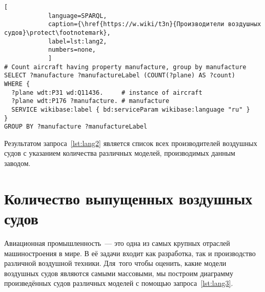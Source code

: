 \begin{lstlisting}[ 
            language=SPARQL, 
            caption={\href{https://w.wiki/t3n}{Производители воздушных судов}\protect\footnotemark}, 
            label=lst:lang2, 
            numbers=none,
            ]
# Count aircraft having property manufacture, group by manufacture
SELECT ?manufacture ?manufactureLabel (COUNT(?plane) AS ?count) 
WHERE {
  ?plane wdt:P31 wd:Q11436.     # instance of aircraft
  ?plane wdt:P176 ?manufacture. # manufacture
  SERVICE wikibase:label { bd:serviceParam wikibase:language "ru" }
}
GROUP BY ?manufacture ?manufactureLabel
\end{lstlisting}

Результатом запроса~\ref{lst:lang2} является список всех производителей воздушных судов с указанием количества различных моделей, производимых данным заводом.



\section{Количество выпущенных воздушных судов}%

Авиационная промышленность~--- это одна из самых крупных отраслей машиностроения в мире. 
В её задачи входит как разработка, так и производство различной воздушной техники. 
Для~того чтобы оценить, какие модели воздушных судов являются самыми массовыми, 
мы построим диаграмму произведённых судов различных моделей 
с помощью запроса~\ref{lst:lang3}.

